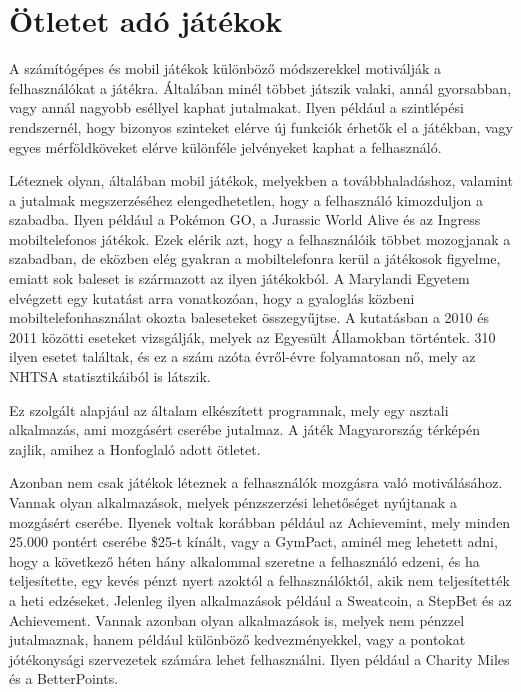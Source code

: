 \section{Ötletet adó játékok}

A számítógépes és mobil játékok különböző módszerekkel motiválják a felhasználókat a játékra.
Általában minél többet játszik valaki, annál gyorsabban, vagy annál nagyobb eséllyel kaphat jutalmakat.
Ilyen például a szintlépési rendszernél, hogy bizonyos szinteket elérve új funkciók érhetők el a játékban, vagy egyes mérföldköveket elérve különféle jelvényeket kaphat a felhasználó.

Léteznek olyan, általában mobil játékok, melyekben a továbbhaladáshoz, valamint a jutalmak megszerzéséhez elengedhetetlen, hogy a felhasználó kimozduljon a szabadba.
Ilyen például a Pokémon GO, a Jurassic World Alive és az Ingress mobiltelefonos játékok.
Ezek elérik azt, hogy a felhasználóik többet mozogjanak a szabadban, de eközben elég gyakran a mobiltelefonra kerül a játékosok figyelme, emiatt sok baleset is származott az ilyen játékokból.
A Marylandi Egyetem elvégzett egy kutatást arra vonatkozóan, hogy a gyaloglás közbeni mobiltelefonhasználat okozta baleseteket összegyűjtse.
A kutatásban a 2010 és 2011 közötti eseteket vizsgálják, melyek az Egyesült Államokban történtek.
310 ilyen esetet találtak, és ez a szám azóta évről-évre folyamatosan nő, mely az NHTSA statisztikáiból is látszik.\cite{nhtsa}\cite{maryland}
 
Ez szolgált alapjául az általam elkészített programnak, mely egy asztali alkalmazás, ami mozgásért cserébe jutalmaz.
A játék Magyarország térképén zajlik, amihez a Honfoglaló adott ötletet. 

Azonban nem csak játékok léteznek a felhasználók mozgásra való motiválásához.
Vannak olyan alkalmazások, melyek pénzszerzési lehetőséget nyújtanak a mozgásért cserébe.
Ilyenek voltak korábban például az Achievemint, mely minden 25.000 pontért cserébe \$25-t kínált, vagy a GymPact, aminél meg lehetett adni, hogy a következő héten hány alkalommal szeretne a felhasználó edzeni, és ha teljesítette, egy kevés pénzt nyert azoktól a felhasználóktól, akik nem teljesítették a heti edzéseket.\cite{app}
Jelenleg ilyen alkalmazások például a Sweatcoin, a StepBet és az Achievement.
Vannak azonban olyan alkalmazások is, melyek nem pénzzel jutalmaznak, hanem például különböző kedvezményekkel, vagy a pontokat jótékonysági szervezetek számára lehet felhasználni.
Ilyen például a Charity Miles és a BetterPoints.


